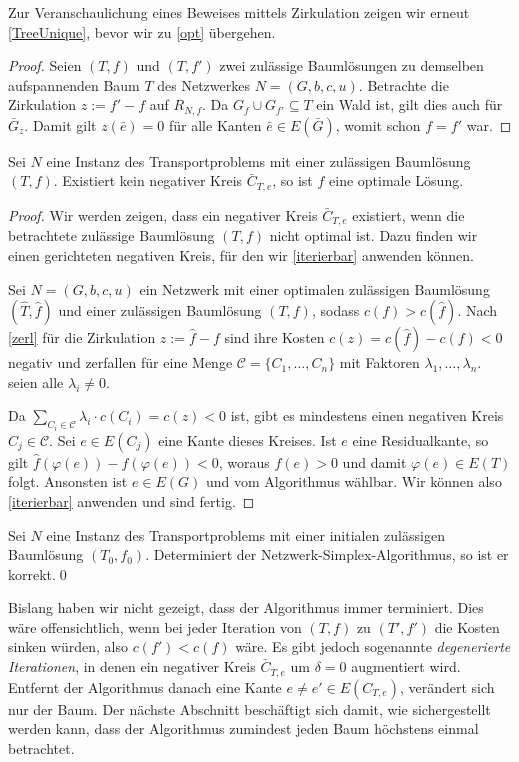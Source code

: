 Zur Veranschaulichung eines Beweises mittels Zirkulation zeigen wir erneut \cref{TreeUnique}, bevor wir zu \cref{opt} übergehen. 

\TreeUnique*
\begin{proof}Seien $(T,f)$ und $(T,f')$ zwei zulässige Baumlösungen zu demselben aufspannenden Baum $T$ des Netzwerkes $N=(G,b,c,u)$. Betrachte die Zirkulation $z:=f'-f$ auf $R_{N,f}$. Da $G_f\cup G_{f'}\subseteq T$ ein Wald ist, gilt dies auch für $\bar{G}_z$. Damit gilt $z(\bar{e}) = 0$ für alle Kanten $\bar{e}\in E(\bar{G})$, womit schon $f=f'$ war.\end{proof}

\begin{thm}\label{opt}Sei $N$ eine Instanz des Transportproblems mit einer zulässigen Baumlösung $(T,f)$. Existiert kein negativer Kreis $\bar{C}_{T,e}$, so ist $f$ eine optimale Lösung.\end{thm}
\begin{proof}Wir werden zeigen, dass ein negativer Kreis $\bar{C}_{T,e}$ existiert, wenn die betrachtete zulässige Baumlösung $(T,f)$ nicht optimal ist. Dazu finden wir einen gerichteten negativen Kreis, für den wir \cref{iterierbar} anwenden können.
	
Sei $N=(G,b,c,u)$ ein Netzwerk mit einer optimalen zulässigen Baumlösung $(\hat{T},\hat{f})$ und einer zulässigen Baumlösung $(T,f)$, sodass $c(f)>c(\hat{f})$. Nach \cref{zerl} für die Zirkulation $z:=\hat{f}-f$ sind ihre Kosten $c(z)=c(\hat{f})-c(f)<0$ negativ und zerfallen für eine Menge $\mathscr{C}=\{C_1,\ldots,C_n\}$ mit Faktoren $\lambda_1,\ldots,\lambda_n$. \Obda seien alle $\lambda_i\neq 0$.

Da $\sum_{C_i\in\mathscr{C}} \lambda_i\cdot c(C_i)=c(z)<0$ ist, gibt es mindestens einen negativen Kreis $C_j\in\mathscr{C}$. Sei $e\in E(C_j)$ eine Kante dieses Kreises. Ist $e$ eine Residualkante, so gilt $\hat{f}(\varphi(e))-f(\varphi(e))<0$, woraus $f(e)>0$ und damit $\varphi(e)\in E(T)$ folgt. Ansonsten ist $e\in E(G)$ und vom Algorithmus wählbar. Wir können also \cref{iterierbar} anwenden und sind fertig.\end{proof}

\begin{kor}\label{korrekt}Sei $N$ eine Instanz des Transportproblems mit einer initialen zulässigen Baumlösung $(T_0,f_0)$. Determiniert der Netzwerk-Simplex-Algorithmus, so ist er korrekt.\qed\end{kor}

Bislang haben wir nicht gezeigt, dass der Algorithmus immer terminiert. Dies wäre offensichtlich, wenn bei jeder Iteration von $(T,f)$ zu $(T',f')$ die Kosten sinken würden, also $c(f')<c(f)$ wäre. Es gibt jedoch sogenannte \emph{degenerierte Iterationen}, in denen ein negativer Kreis $\bar{C}_{T,e}$ um $\delta=0$ augmentiert wird. Entfernt der Algorithmus danach eine Kante $e\neq e'\in E(C_{T,e})$, verändert sich nur der Baum. Der nächste Abschnitt beschäftigt sich damit, wie sichergestellt werden kann, dass der Algorithmus zumindest jeden Baum höchstens einmal betrachtet.

